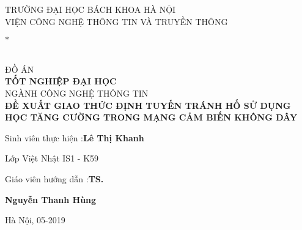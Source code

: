 \documentclass[12pt]{report}
\begin{document}
\begin{titlepage}
\begin{center}
\fontsize{16pt}{12pt}\selectfont
TRƯỜNG ĐẠI HỌC BÁCH KHOA HÀ NỘI \\
VIỆN CÔNG NGHỆ THÔNG TIN VÀ TRUYỀN THÔNG 
$ \ast $
\\ [5cm]
\fontsize{30pt}{12pt}\selectfont
ĐỒ ÁN \\

\fontsize{32pt}{12pt}\selectfont
\textbf{TỐT NGHIỆP ĐẠI HỌC} \\ [1cm]

\fontsize{18pt}{12pt}\selectfont
\textsf{NGÀNH CÔNG NGHỆ THÔNG TIN}  \\ [2cm]

\fontsize{17pt}{12pt}\selectfont
\textbf{ĐỀ XUẤT GIAO THỨC ĐỊNH TUYẾN TRÁNH HỐ SỬ DỤNG HỌC TĂNG CƯỜNG TRONG MẠNG CẢM BIẾN KHÔNG DÂY} \\ [3cm]

\fontsize{14pt}{12pt}\selectfont
\begin{adjustwidth}{120pt}{}
Sinh viên thực hiện \hspace{9pt}:\quad\textbf{Lê Thị Khanh}\\
\end{adjustwidth}
\begin{adjustwidth}{269pt}{}
Lớp Việt Nhật IS1 - K59 \\
\end{adjustwidth}
\begin{adjustwidth}{120pt}{}
Giáo viên hướng dẫn \hspace{1pt}:\quad  \textbf{TS.}\\
\end{adjustwidth}
\begin{adjustwidth}{255pt}{}
\quad \textbf{Nguyễn Thanh Hùng} \\[2cm]
\end{adjustwidth} 

\fontsize{16pt}{12pt} Hà Nội, 05-2019
\end{center}
\end{titlepage}
\end{document}
